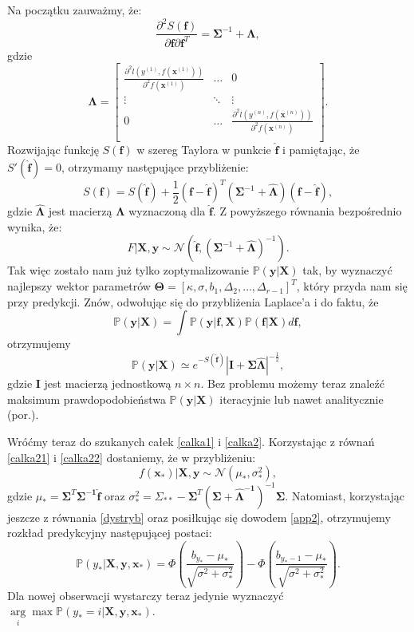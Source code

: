 \documentclass{mini}
\newcommand{\argmax}{\arg\!\max}
\begin{document}
Na początku zauważmy, że:
$$
\frac{\partial^2 S(\mathbf{f})}{\partial \mathbf{f}\partial \mathbf{f}^T} = 
\mathbf{\Sigma}^{-1}+\mathbf{\Lambda},
$$
gdzie
$$
\mathbf{\Lambda} = 
	\left[
        \begin{array}{ccc}
         \frac{\partial^2\textit{l}(y^{(1)}, f(\mathbf{x}^{(1)}))}{\partial^2 f(\mathbf{x}^{(1)})} & \ldots & 0\\
         \vdots & \ddots & \vdots \\
         0 & \ldots & \frac{\partial^2\textit{l}(y^{(n)}, f(\mathbf{x}^{(n)}))}{\partial^2 f(\mathbf{x}^{(n)})} \\
        \end{array}
    \right]. 
$$
Rozwijając funkcję $S(\mathbf{f})$ w szereg Taylora w punkcie $\mathbf{\hat{f}}$ i pamiętając, że $S'(\mathbf{\hat{f}})=0$, otrzymamy następujące przybliżenie:
$$
S(\mathbf{f}) = S(\mathbf{\hat{f}}) + \frac{1}{2}(\mathbf{f} - \mathbf{\hat{f}})^T(\mathbf{\Sigma}^{-1}+\hat{\mathbf{\Lambda}})(\mathbf{f}-\mathbf{\hat{f}}),
$$
gdzie $\hat{\mathbf{\Lambda}}$ jest macierzą $\mathbf{\Lambda}$ wyznaczoną dla $\mathbf{\hat{f}}$. Z powyższego równania bezpośrednio wynika, że:
\begin{equation}\label{calka22}
F | \textbf{X}, \textbf{y} \sim \mathcal{N}\left(  \mathbf{\hat{f}}, (\mathbf{\Sigma}^{-1}+\hat{\mathbf{\Lambda}})^{-1}  \right).
\end{equation}
Tak więc zostało nam już tylko zoptymalizowanie $\mathbb{P}(\mathbf{y} | \textbf{X})$ tak, by wyznaczyć najlepszy wektor parametrów $\mathbf{\Theta} = [\kappa, \sigma, b_1, \Delta_2, \ldots, \Delta_{r-1}]^T$, który przyda nam się przy predykcji. Znów, odwołując się do przybliżenia Laplace'a i do faktu, że
$$
\mathbb{P}(\mathbf{y} | \textbf{X}) = 
\int \mathbb{P}(\mathbf{y}|\mathbf{f}, \textbf{X})\mathbb{P}(\mathbf{f}|\textbf{X}) d\mathbf{f},
$$ 
otrzymujemy
$$
\mathbb{P}(\mathbf{y} | \textbf{X}) \simeq e^{-S(\mathbf{\hat{f}})} \left\vert \mathbf{I} + \mathbf{\Sigma}\mathbf{\hat{\Lambda}} \right\vert^{-\frac{1}{2}},
$$
gdzie $\mathbf{I}$ jest macierzą jednostkową $n\times n$. Bez problemu możemy teraz znaleźć maksimum prawdopodobieństwa $\mathbb{P}(\mathbf{y} | \textbf{X})$ iteracyjnie lub nawet analitycznie (por.\cite{reg}).  

Wróćmy teraz do szukanych całek \eqref{calka1} i \eqref{calka2}. Korzystając z równań \eqref{calka21} i \eqref{calka22} dostaniemy, że w przybliżeniu:
$$
f(\mathbf{x}_{\ast}) | \textbf{X}, \textbf{y} \sim \mathcal{N}(\mu_{\ast}, \sigma_{\ast}^2),
$$
gdzie $\mu_{\ast} = \mathbf{\Sigma}^T \mathbf{\Sigma^{-1}} \mathbf{\hat{f}}$ oraz $\sigma_{\ast}^2 = \Sigma_{\ast\ast}-\mathbf{\Sigma}^T(\mathbf{\Sigma + \mathbf{\hat{\Lambda}}^{-1}})^{-1}\mathbf{\Sigma}$. Natomiast, korzystając jeszcze z równania \eqref{dystryb} oraz posiłkując się dowodem \ref{app2}, otrzymujemy rozkład predykcyjny następującej postaci:
$$
\mathbb{P}(y_{\ast} | \textbf{X}, \textbf{y}, \mathbf{x}_{\ast}) = 
\Phi\left(\frac{b_{y_{\ast}}-\mu_{\ast}}{\sqrt{\sigma^2+\sigma^2_{\ast}}} \right) 
- 
\Phi\left( \frac{b_{y_{\ast}-1}-\mu_{\ast}}{\sqrt{\sigma^2+\sigma^2_{\ast}}} \right).
$$
Dla nowej obserwacji wystarczy teraz jedynie wyznaczyć $\underset{i}\argmax \mathbb{P}(y_{\ast}=i | \textbf{X}, \textbf{y}, \mathbf{x}_{\ast})$.
\end{document}
